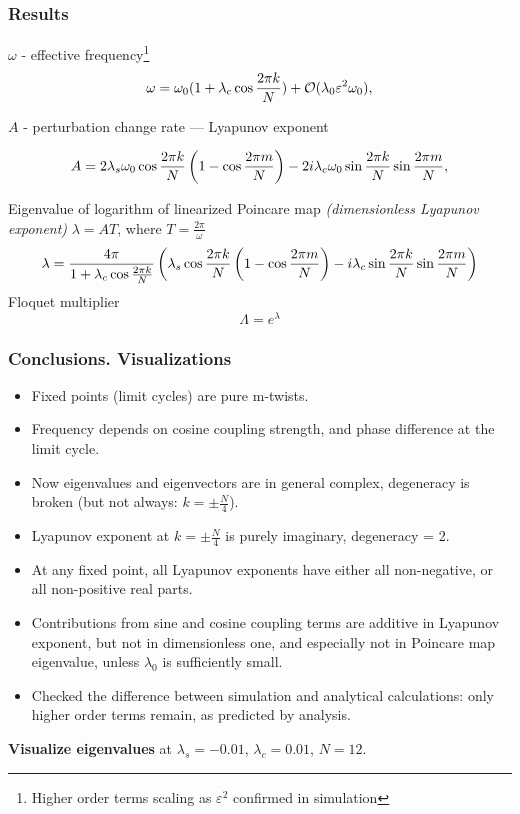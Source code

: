 \documentclass[a4paper,12pt]{article}
\newcommand*{\eps}{\varepsilon}
\newcommand*{\bigO}{\mathcal{O}}
\begin{document}
\subsubsection{Results}

$\omega$ - effective frequency\footnote{Higher order terms scaling as $\eps ^2$ confirmed in simulation}
$$
 \omega = \omega_0 (1 + \lambda_c \co{k}{}) + \bigO(\lambda_0 \eps^2 \omega_0 ),
$$

$A$ - perturbation change rate --- Lyapunov exponent

$$ 
A = 
 2 \lambda_s \omega_0 \cos \frac{2 \pi k} {N}  \left(1 - \cos \frac{2 \pi m} {N}  \right)
- 2 i \lambda_c \omega_0 \sin \frac{2 \pi k} {N}  \sin \frac{2 \pi m} {N} ,
$$

Eigenvalue of logarithm of linearized Poincare map \textit{(dimensionless Lyapunov exponent)} $\lambda = A T$, where $T = \frac{2 \pi}{\omega}$
$$
\lambda
=\frac{4 \pi} {1 + \lambda_c \cos \frac{2 \pi k} {N} } \left(  \lambda_s \cos \frac{2 \pi k} {N}  \left(1 - \cos \frac{2 \pi m} {N}  \right)
-  i \lambda_c \sin \frac{2 \pi k} {N}  \sin \frac{2 \pi m} {N}  \right) 
$$
Floquet multiplier
$$ 
\Lambda = e^{\lambda}
$$

\subsubsection{Conclusions. Visualizations}

\begin{itemize}
\item Fixed points (limit cycles) are pure m-twists.
\item Frequency depends on cosine coupling strength, and phase difference at the limit cycle.
\item Now eigenvalues and eigenvectors are in general complex, degeneracy is broken (but not always: $k=\pm \frac{N}{4}$).
\item Lyapunov exponent at $k=\pm\frac{N}{4}$  is purely imaginary, degeneracy = 2.
\item At any fixed point, all Lyapunov exponents have either all non-negative, or all non-positive real parts.
\item Contributions from sine and cosine coupling terms are additive in Lyapunov exponent, but not in dimensionless one, and especially not in Poincare map eigenvalue, unless $\lambda_0$ is sufficiently small. 
\item Checked the difference between simulation and analytical calculations: only higher order terms remain, as predicted by analysis.
\end{itemize}

\textbf{Visualize eigenvalues} at 
$\lambda_s = - 0.01$, $\lambda_c = 0.01$, $N=12$.
\end{document}
